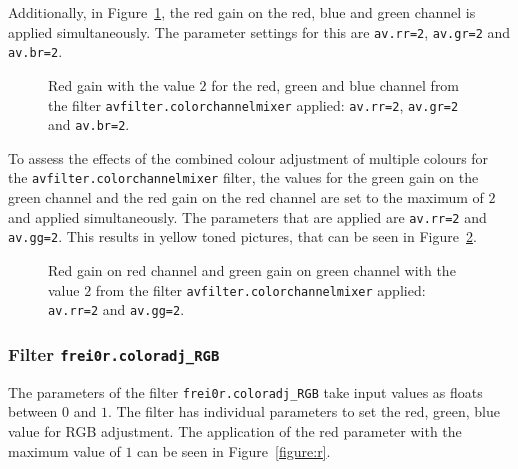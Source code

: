 \documentclass[../MasterThesis.tex]{subfiles}
\begin{document}
Additionally, in Figure~\ref{figure:rrbrgr}, the red gain on the red, blue and green channel is applied simultaneously. The parameter settings for this are \texttt{av.rr=2}, \texttt{av.gr=2} and \texttt{av.br=2}.


\begin{figure}[H]
	\begin{center}
		\caption[Red gain set to $2$ with \texttt{avfilter.colorchannelmixer}.]{Red gain with the value $2$ for the red, green and blue channel from the filter \texttt{avfilter.colorchannelmixer} applied: \texttt{av.rr=2}, \texttt{av.gr=2} and \texttt{av.br=2}.}
		\label{figure:rrbrgr}
	\end{center}
\end{figure}

To assess the effects of the combined colour adjustment of multiple colours for the \texttt{avfilter.colorchannelmixer} filter, the values for the green gain on the green channel and the red gain on the red channel are set to the maximum of $2$ and applied simultaneously. 
The parameters that are applied are \texttt{av.rr=2} and \texttt{av.gg=2}.
This results in yellow toned pictures, that can be seen in Figure~\ref{figure:rrgg}.


\begin{figure}[H]
	\begin{center}
		\caption[Red and green gain set to $2$ with \texttt{avfilter.colorchannelmixer}.]{Red gain on red channel and green gain on green channel with the value $2$ from the filter \texttt{avfilter.colorchannelmixer} applied: \texttt{av.rr=2} and \texttt{av.gg=2}.}
		\label{figure:rrgg}
	\end{center}
\end{figure}







\subsubsection*{Filter \texttt{frei0r.coloradj\_RGB}}

The parameters of the filter \texttt{frei0r.coloradj\_RGB} take input values as floats between $0$ and $1$. The filter has individual parameters to set the red, green, blue value for RGB adjustment. The application of the red parameter with the maximum value of $1$ can be seen in Figure~\ref{figure:r}.
\end{document}
